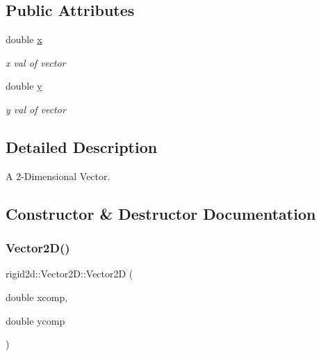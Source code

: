\subsection*{Public Attributes}
\begin{DoxyCompactItemize}
\item 
\mbox{\label{structrigid2d_1_1Vector2D_a1876d655fe2da548c4813777c450845c}} 
double \hyperlink{structrigid2d_1_1Vector2D_a1876d655fe2da548c4813777c450845c}{x}
\begin{DoxyCompactList}\small\item\em x val of vector \end{DoxyCompactList}\item 
\mbox{\label{structrigid2d_1_1Vector2D_aa814ea37ffe4a161b0020609580e4d17}} 
double \hyperlink{structrigid2d_1_1Vector2D_aa814ea37ffe4a161b0020609580e4d17}{y}
\begin{DoxyCompactList}\small\item\em y val of vector \end{DoxyCompactList}\end{DoxyCompactItemize}


\subsection{Detailed Description}
A 2-\/\+Dimensional Vector. 

\subsection{Constructor \& Destructor Documentation}
\mbox{\label{structrigid2d_1_1Vector2D_a26d3fdc99cc873ff8785a70b7f379463}} 
\subsubsection{\texorpdfstring{Vector2\+D()}{Vector2D()}}
{\footnotesize\ttfamily rigid2d\+::\+Vector2\+D\+::\+Vector2D (\begin{DoxyParamCaption}\item[{double}]{xcomp,  }\item[{double}]{ycomp }\end{DoxyParamCaption})}



